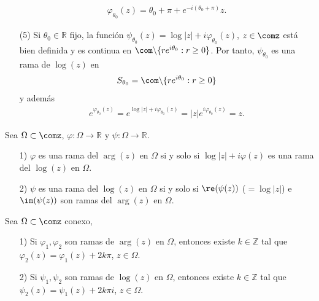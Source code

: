 \begin{ejemplo}
\begin{enumerate}
\begin{align*}
        \varphi_{\theta_0}(z) = \theta_0 + \pi + e^{-i(\theta_0 + \pi)}z.
    \end{align*}
    \item[(5)] Si $\theta_0 \in \mathbb{R}$ fijo, la función $\psi_{\theta_0}(z) = \log|z| + i\varphi_{\theta_0}(z)$, $z \in \comz$ está bien definida y es continua en $\com \backslash \{re^{i\theta_0} : r \ge 0 \}$. Por tanto, $\psi_{\theta_0}$ es una rama de $\log(z)$ en
     \begin{align*}
        S_{\theta_0} = \com \backslash \{ re^{i\theta_0} : r \ge 0 \}
    \end{align*}
    y además
    \begin{align*}
        e^{\varphi_{\theta_0}(z)} = e^{\log|z| + i\varphi_{\theta_0}(z)} = |z|e^{i\varphi_{\theta_0}(z)} = z.
    \end{align*}
\end{enumerate}
\end{ejemplo}

\begin{obs}
Sea $\Omega \subset \comz$, $\varphi : \Omega \longrightarrow \mathbb{R}$ y $\psi : \Omega \longrightarrow \mathbb{R}$.
\begin{enumerate}
    \item[1)] $\varphi$ es una rama del $\arg(z)$ en $\Omega$ si y solo si $\log|z| + i\varphi(z)$ es una rama del $\log(z)$ en $\Omega$.
    \item[2)] $\psi$ es una rama del $\log(z)$ en $\Omega$ si y solo si $\re(\psi(z))$ ($= \log|z|$) e $\im(\psi(z))$ son ramas del $\arg(z)$ en $\Omega$.
\end{enumerate}
\end{obs}

\begin{prop}
Sea $\Omega \subset \comz$ conexo,
\begin{enumerate}
    \item[1)] Si $\varphi_1, \varphi_2$ son ramas de $\arg(z)$ en $\Omega$, entonces existe $k \in \mathbb{Z}$ tal que $\varphi_2(z) = \varphi_1(z) + 2k\pi$, $z \in \Omega$.
    \item[2)] Si $\psi_1, \psi_2$ son ramas de $\log(z)$ en $\Omega$, entonces existe $k \in \mathbb{Z}$ tal que $\psi_2(z) = \psi_1(z) + 2k\pi i$, $z \in \Omega$.
\end{enumerate}
\end{prop}

